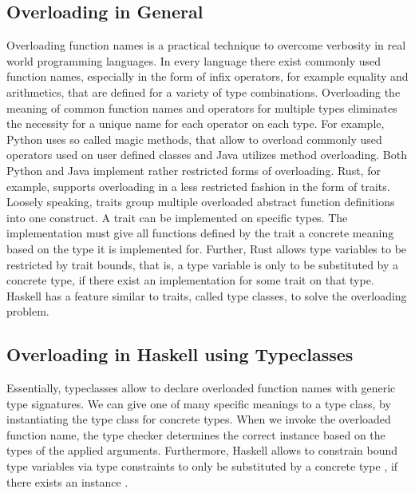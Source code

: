 \subsection{Overloading in General}
Overloading function names is a practical technique to overcome verbosity in real world programming languages. In every language there exist commonly used function names, especially in the form of infix operators, for example equality and arithmetics, that are defined for a variety of type combinations. Overloading the meaning of common function names and operators for multiple types eliminates the necessity for a unique name for each operator on each type. 
For example, Python uses so called magic methods, that allow to overload commonly used operators used on user defined classes and Java utilizes method overloading. Both Python and Java implement rather restricted forms of overloading. Rust, for example, supports overloading in a less restricted fashion in the form of traits. Loosely speaking, traits group multiple overloaded abstract function definitions into one construct. A trait can be implemented on specific types. The implementation must give all functions defined by the trait a concrete meaning based on the type it is implemented for. Further, Rust allows type variables to be restricted by trait bounds, that is, a type variable is only to be substituted by a concrete type, if there exist an implementation for some trait on that type. Haskell has a feature similar to traits, called type classes, to solve the overloading problem.
\subsection{Overloading in Haskell using Typeclasses}
Essentially, typeclasses allow to declare overloaded function names with generic type signatures.
We can give one of many specific meanings to a type class, by instantiating the type class for concrete types.
When we invoke the overloaded function name, the type checker determines the correct instance based on the types of the applied arguments. 
Furthermore, Haskell allows to constrain bound type variables  via type constraints  to only be substituted by a concrete type , if there exists an instance  .

